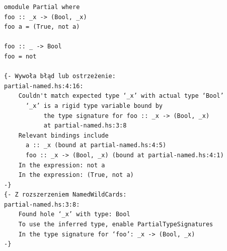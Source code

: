 \begin{lstlisting}[float,label={lst:partialsigs_named_wcs},
                   caption={Demonstracja różnicy między zmienną z podkreślnikiem i nazwanym wieloznacznikiem.}]
omodule Partial where
foo :: _x -> (Bool, _x)
foo a = (True, not a)

foo :: _ -> Bool
foo = not

{- Wywoła błąd lub ostrzeżenie:
partial-named.hs:4:16:
    Couldn't match expected type ‘_x’ with actual type ‘Bool’
      ‘_x’ is a rigid type variable bound by
           the type signature for foo :: _x -> (Bool, _x)
           at partial-named.hs:3:8
    Relevant bindings include
      a :: _x (bound at partial-named.hs:4:5)
      foo :: _x -> (Bool, _x) (bound at partial-named.hs:4:1)
    In the expression: not a
    In the expression: (True, not a)
-}
{- Z rozszerzeniem NamedWildCards:
partial-named.hs:3:8:
    Found hole ‘_x’ with type: Bool
    To use the inferred type, enable PartialTypeSignatures
    In the type signature for ‘foo’: _x -> (Bool, _x)
-}
\end{lstlisting}
